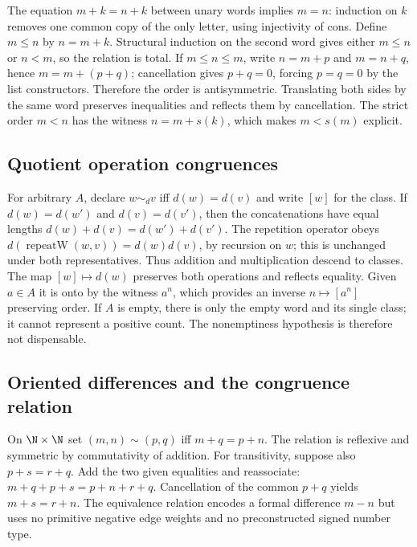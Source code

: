 The equation $m+k=n+k$ between unary words implies $m=n$: induction on $k$ removes one common copy of the only letter, using injectivity of cons. Define $m\le n$ by $n=m+k$. Structural induction on the second word gives either $m\le n$ or $n<m$, so the relation is total. If $m\le n\le m$, write $n=m+p$ and $m=n+q$, hence $m=m+(p+q)$; cancellation gives $p+q=0$, forcing $p=q=0$ by the list constructors. Therefore the order is antisymmetric. Translating both sides by the same word preserves inequalities and reflects them by cancellation. The strict order $m<n$ has the witness $n=m+s(k)$, which makes $m<s(m)$ explicit.

\subsection{Quotient operation congruences}\label{supp:4-4}
\par{}\par\smallskip

For arbitrary $A$, declare $w\sim_d v$ iff $d(w)=d(v)$ and write $[w]$ for the class. If $d(w)=d(w')$ and $d(v)=d(v')$, then the concatenations have equal lengths $d(w)+d(v)=d(w')+d(v')$. The repetition operator obeys $d(\operatorname{repeatW}(w,v))=d(w)d(v)$, by recursion on $w$; this is unchanged under both representatives. Thus addition and multiplication descend to classes. The map $[w]\mapsto d(w)$ preserves both operations and reflects equality. Given $a\in A$ it is onto by the witness $a^n$, which provides an inverse $n\mapsto[a^n]$ preserving order. If $A$ is empty, there is only the empty word and its single class; it cannot represent a positive count. The nonemptiness hypothesis is therefore not dispensable.

\subsection{Oriented differences and the congruence relation}\label{supp:5-1}
\par{}\par\smallskip

On $\N\times\N$ set $(m,n)\sim(p,q)$ iff $m+q=p+n$. The relation is reflexive and symmetric by commutativity of addition. For transitivity, suppose also $p+s=r+q$. Add the two given equalities and reassociate: $m+q+p+s=p+n+r+q$. Cancellation of the common $p+q$ yields $m+s=r+n$. The equivalence relation encodes a formal difference $m-n$ but uses no primitive negative edge weights and no preconstructed signed number type.

